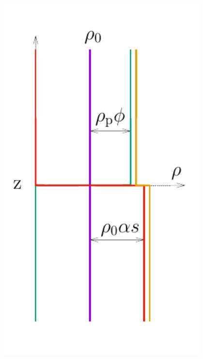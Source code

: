\documentclass[final]{beamer} %
\begin{document}
\begin{frame}[t]
\begin{columns}[t]
\begin{column}{0.3\paperwidth}
\begin{columns}[t]
\begin{column}{0.12\paperwidth}
          \begin{figure}
            \includegraphics[height=20cm]{init_config.pdf}
          \end{figure}
        \end{column}

        \begin{column}{0.17\paperwidth}
          

\end{column}
\end{columns}
\end{column}
\end{columns}
\end{frame}
\end{document}
